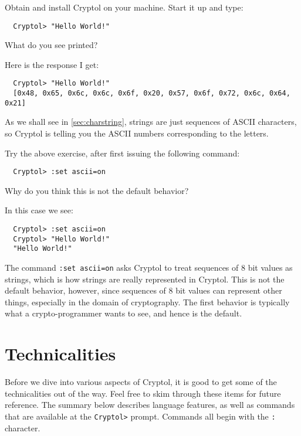 \begin{Exercise}\label{ex:helloWorld1}
Obtain and install Cryptol on your machine.  Start it up and type:
\begin{Verbatim}
  Cryptol> "Hello World!"
\end{Verbatim}
What do you see printed?
\end{Exercise}
\begin{Answer}
Here is the response I get:
\begin{small}
\begin{Verbatim}
  Cryptol> "Hello World!"
  [0x48, 0x65, 0x6c, 0x6c, 0x6f, 0x20, 0x57, 0x6f, 0x72, 0x6c, 0x64, 0x21]
\end{Verbatim}
\end{small}
As we shall see in \autoref{sec:charstring}, strings are just
sequences of ASCII characters, so Cryptol is telling you the ASCII
numbers corresponding to the letters.
\end{Answer}
\begin{Exercise}\label{ex:helloWorld2}
Try the above exercise, after first issuing the following command:
\begin{Verbatim}
  Cryptol> :set ascii=on
\end{Verbatim}
Why do you think this is not the default behavior?\indSettingASCII
\end{Exercise}
\begin{Answer}
In this case we see:\indSettingASCII
\begin{Verbatim}
  Cryptol> :set ascii=on
  Cryptol> "Hello World!"
  "Hello World!"
\end{Verbatim}
The command {\tt :set ascii=on} asks Cryptol to treat sequences of 8
bit values as strings, which is how strings are really represented in
Cryptol.  This is not the default behavior, however, since sequences
of 8 bit values can represent other things, especially in the domain
of cryptography.  The first behavior is typically what a
crypto-programmer wants to see, and hence is the default.
\end{Answer}

\section{Technicalities}
\label{sec:technicalities}

Before we dive into various aspects of Cryptol, it is good to get some
of the technicalities out of the way. Feel free to skim through these
items for future reference. The summary below describes language
features, as well as commands that are available at the {\tt Cryptol>}
prompt. Commands all begin with the {\tt :} character.

